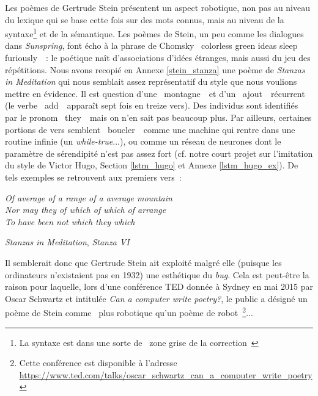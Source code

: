 \documentclass{article}
\newenvironment{citationbox}
{\begin{center}
		\begin{minipage}{.8\textwidth}
		}
		{
		\end{minipage}	
\end{center}
}
\begin{document}
				Les poèmes de Gertrude Stein présentent un aspect robotique, non pas au niveau du lexique qui se base cette fois sur des mots connus, mais au niveau de la syntaxe\footnote{La syntaxe est dans une sorte de \guillemotleft~zone grise de la correction~\guillemotright} et de la sémantique. Les poèmes de Stein, un peu comme les dialogues dans \textit{Sunspring}, font écho à la phrase de Chomsky \guillemotleft~colorless green ideas sleep furiously~\guillemotright~: le poétique naît d'associations d'idées étranges, mais aussi du jeu des répétitions. Nous avons recopié en Annexe \ref{stein_stanza} une poème de \textit{Stanzas in Meditation} qui nous semblait assez représentatif du style que nous voulions mettre en évidence. Il est question d'une \guillemotleft~montagne~\guillemotright~et d'un \guillemotleft~ajout~\guillemotright~récurrent (le verbe \guillemotleft~add~\guillemotright~apparaît sept fois en treize vers). Des individus sont identifiés par le pronom \guillemotleft~they~\guillemotright~mais on n'en sait pas beaucoup plus. Par ailleurs, certaines portions de vers semblent \guillemotleft~boucler~\guillemotright~comme une machine qui rentre dans une routine infinie (un \textit{while-true}...), ou comme un réseau de neurones dont le paramètre de sérendipité n'est pas assez fort (cf. notre court projet sur l'imitation du style de Victor Hugo, Section \ref{lstm_hugo} et Annexe \ref{lstm_hugo_ex}). De tels exemples se retrouvent aux premiers vers~: 
				\begin{citationbox}
					\textit{Of average of a range of a average mountain\\
						Nor may they of which of which of arrange\\
						To have been not which they which}
					\begin{flushright}
						\textit{Stanzas in Meditation}, \textit{Stanza VI} \autocite{stein1932}
					\end{flushright}
				\end{citationbox}
				Il semblerait donc que Gertrude Stein ait exploité malgré elle (puisque les ordinateurs n'existaient pas en 1932) une esthétique du \textit{bug}. Cela est peut-être la raison pour laquelle, lors d'une conférence TED donnée à Sydney en mai 2015 par Oscar Schwartz et intitulée \textit{Can a computer write poetry?}, le public a désigné un poème de Stein comme \guillemotleft~plus robotique qu'un poème de robot~\guillemotright\footnote{Cette conférence est disponible à l'adresse \href{https://www.ted.com/talks/oscar_schwartz_can_a_computer_write_poetry}{https://www.ted.com/talks/oscar\_schwartz\_can\_a\_computer\_write\_poetry}}...\\
				
\end{document}

